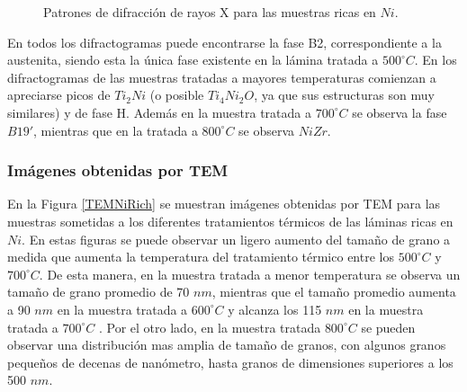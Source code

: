 \documentclass[12pt]{article}
\theoremstyle{definition}
\theoremstyle{remark}
\begin{document}
{\begin{figure}[H]
\caption{Patrones de difracción de rayos X para las muestras ricas en $Ni$.}
\label{RXNiRich}
\end{figure}

En todos los difractogramas puede encontrarse la fase B2, correspondiente a la austenita, siendo esta la única fase existente en la lámina tratada a $500 ^\circ C$. En los difractogramas de las muestras tratadas a mayores temperaturas comienzan a apreciarse picos de $Ti_2Ni$ (o posible $Ti_4Ni_2O$, ya que sus estructuras son muy similares) y de fase H. Además en la muestra tratada a $700 ^\circ C$ se observa la fase $B19'$, mientras que en la tratada a $800 ^\circ C$ se observa $NiZr$.

\subsubsection{Imágenes obtenidas por TEM}

En la Figura \ref{TEMNiRich} se muestran imágenes obtenidas por TEM para las muestras sometidas a los diferentes tratamientos térmicos de las láminas ricas en $Ni$. En estas figuras se puede observar un ligero aumento del tamaño de grano a medida que aumenta la temperatura del tratamiento térmico entre los $500 ^\circ C$ y $700 ^\circ C$. De esta manera, en la muestra tratada a menor temperatura se observa un tamaño de grano promedio de 70 $nm$, mientras que el tamaño promedio aumenta a 90 $nm$ en la muestra tratada a $600 ^\circ C$ y alcanza los 115 $nm$ en la muestra tratada a $700 ^\circ C$ . Por el otro lado, en la muestra tratada $800 ^\circ C$ se pueden observar una distribución mas amplia de tamaño de granos, con algunos granos pequeños de decenas de nanómetro, hasta granos de dimensiones superiores a los 500 $nm$. 

}
\end{document}
